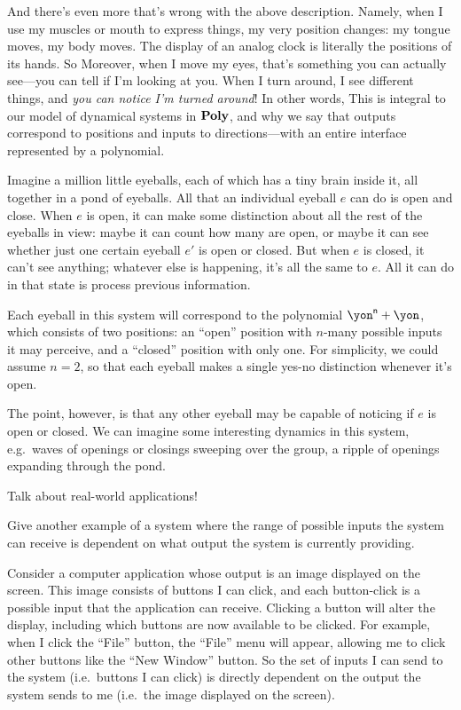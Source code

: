 \documentclass[Book-Poly]{subfiles}
\begin{document}
And there's even more that's wrong with the above description.
Namely, when I use my muscles or mouth to express things, my very position changes: my tongue moves, my body moves.
The display of an analog clock is literally the positions of its hands.
So
Moreover, when I move my eyes, that's something you can actually see---you can tell if I'm looking at you.
When I turn around, I see different things, and \emph{you can notice I'm turned around}!
In other words,
This is integral to our model of dynamical systems in $\mathbf{Poly}$, and why we say that outputs correspond to positions and inputs to directions---with an entire interface represented by a polynomial.

\begin{example}\label{ex.pond_eyeballs}
Imagine a million little eyeballs, each of which has a tiny brain inside it, all together in a pond of eyeballs. All that an individual eyeball $e$ can do is open and close. When $e$ is open, it can make some distinction about all the rest of the eyeballs in view: maybe it can count how many are open, or maybe it can see whether just one certain eyeball $e'$ is open or closed. But when $e$ is closed, it can't see anything; whatever else is happening, it's all the same to $e$. All it can do in that state is process previous information.

Each eyeball in this system will correspond to the polynomial $\yon^\ord{n}+\yon$, which consists of two positions: an ``open'' position with $n$-many possible inputs it may perceive, and a ``closed'' position with only one. For simplicity, we could assume $n=2$, so that each eyeball makes a single yes-no distinction whenever it's open.

The point, however, is that any other eyeball may be capable of noticing if $e$ is open or closed. We can imagine some interesting dynamics in this system, e.g.\ waves of openings or closings sweeping over the group, a ripple of openings expanding through the pond.

Talk about real-world applications! 
\end{example}

\begin{exercise}
Give another example of a system where the range of possible inputs the system can receive is dependent on what output the system is currently providing.
\begin{solution}
Consider a computer application whose output is an image displayed on the screen.
This image consists of buttons I can click, and each button-click is a possible input that the application can receive.
Clicking a button will alter the display, including which buttons are now available to be clicked.
For example, when I click the ``File'' button, the ``File'' menu will appear, allowing me to click other buttons like the ``New Window'' button.
So the set of inputs I can send to the system (i.e.\ buttons I can click) is directly dependent on the output the system sends to me (i.e.\ the image displayed on the screen).
\end{solution}
\end{exercise}
\end{document}
